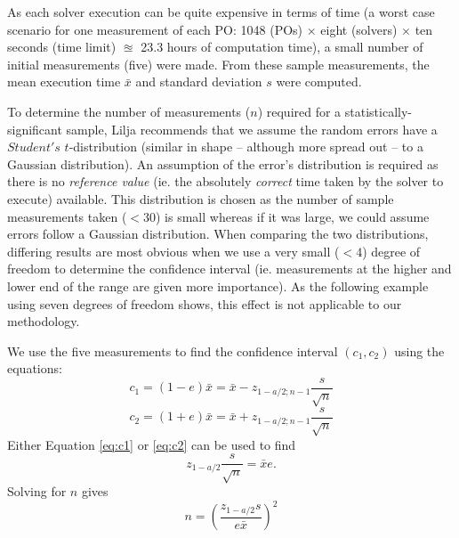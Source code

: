 As each solver execution can be quite expensive in terms of time (a worst case scenario for one measurement of each PO: 1048 (POs) $\times$ eight (solvers) $\times$ ten seconds (time limit) $\approxeq$ 23.3 hours of computation time), a small number of initial measurements (five) were made. 
From these sample measurements, the mean execution time $\bar{x}$ and standard deviation $s$ were computed. 

To determine the number of measurements ($n$) required for a statistically-significant sample, Lilja recommends that we assume the random errors have a $Student's$ $t$-distribution (similar in shape -- although more spread out -- to a Gaussian distribution). 
An assumption of the error's distribution is required as there is no \textit{reference value} (ie. the absolutely \textit{correct} time taken by the solver to execute) available.
This distribution is chosen as the number of sample measurements taken ($<30$) is small whereas if it was large, we could assume errors follow a Gaussian distribution.
When comparing the two distributions, differing results are most obvious when we use a very small ($<4$) degree of freedom to determine the confidence interval (ie. measurements at the higher and lower end of the range are given more importance). 
As the following example using seven degrees of freedom shows, this effect is not applicable to our methodology.  

We use the five measurements to find the confidence interval $(c_1, c_2)$ using the equations:
\begin{equation}
	c_1=(1-e)\bar{x} = \bar{x}-z_{1-a/2;n-1}\frac{s}{\sqrt{n}} 
	\label{eq:c1}
\end{equation}
\begin{equation}
	c_2=(1+e)\bar{x} = \bar{x}+z_{1-a/2;n-1}\frac{s}{\sqrt{n}}
	\label{eq:c2}
\end{equation}
Either Equation \ref{eq:c1} or \ref{eq:c2} can be used to find 
\begin{equation}
	z_{1-a/2}\frac{s}{\sqrt{n}} = \bar{x}e.
	\label{eq:simp}
\end{equation}
Solving for $n$ gives
\begin{equation}
	n =
	 \left(\frac{z_{1-a/2}s}{e\bar{x}}\right)^2
	\label{eq:n}
\end{equation}
  
